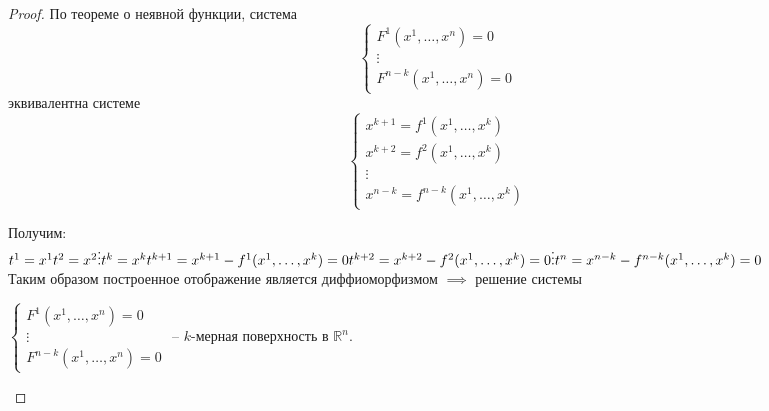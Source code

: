 \documentclass{report}
\theoremstyle{definition}
\begin{document}
\begin{proof}
  По теореме о неявной функции, система
  \begin{equation*}
    \left\{\begin{array}{l}
      F^1(x^1,\ldots,x^n) = 0 \\
      \vdots                  \\
      F^{n-k}(x^1,\ldots,x^n) = 0
    \end{array}\right.
  \end{equation*}
  эквивалентна системе
  \begin{equation*}
    \left\{\begin{array}{l}
      x^{k+1} = f^1(x^1,\ldots,x^k) \\
      x^{k+2} = f^2(x^1,\ldots,x^k) \\
      \vdots                        \\
      x^{n-k} = f^{n-k}(x^1,\ldots,x^k)
    \end{array}\right.
  \end{equation*}

  Получим: \\

  $t^1 = x^1 \\
    t^2 = x^2 \\
    \vdots \\
    t^k = x^k \\
    t^{k+1} = x^{k+1} - f^1(x^1,\ldots,x^k) = 0 \\
    t^{k+2} = x^{k+2} - f^2(x^1,\ldots,x^k) = 0 \\
    \vdots \\
    t^{n} = x^{n-k} - f^{n-k}(x^1,\ldots,x^k) = 0$ \\

  Таким образом построенное отображение является диффиоморфизмом $\implies$ решение системы
  \begin{center}
    $\left\{\begin{array}{l}
        F^1(x^1,\ldots,x^n) = 0 \\
        \vdots                  \\
        F^{n-k}(x^1,\ldots,x^n) = 0
      \end{array}\right.$ -- $k$-мерная поверхность в $\mathbb{R}^n$.
  \end{center}
\end{proof}
\end{document}
